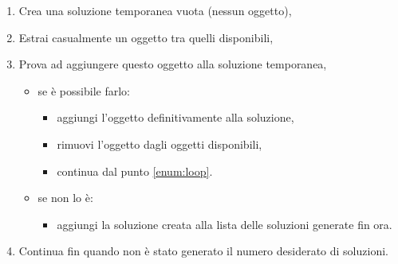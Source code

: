 \begin{enumerate}
    \item Crea una soluzione temporanea vuota (nessun oggetto),
    \item Estrai casualmente un oggetto tra quelli disponibili, \label{enum:loop}
    \item Prova ad aggiungere questo oggetto alla soluzione temporanea, \label{enum:check}
          \begin{itemize}
              \item se è possibile farlo: \begin{itemize}
                        \item aggiungi l'oggetto definitivamente alla soluzione,
                        \item rimuovi l'oggetto dagli oggetti disponibili,
                        \item continua dal punto \ref{enum:loop}.
                    \end{itemize}
              \item se non lo è: \begin{itemize}
                        \item aggiungi la soluzione creata alla lista delle
                              soluzioni generate fin ora.
                    \end{itemize}
          \end{itemize}
    \item Continua fin quando non è stato generato il numero desiderato di soluzioni.
\end{enumerate}

